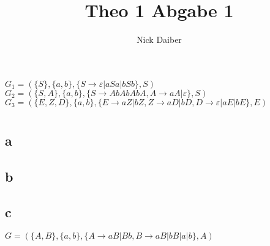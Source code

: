 \documentclass{article}
\title{Theo 1 Abgabe 1}
\author{Nick Daiber}
\begin{document}
    \maketitle
    \section{}
        $G_1 = 
        (\{S\},
        \{a, b\},
        \{S\rightarrow\varepsilon|aSa|bSb\},
        S)$\\
        $G_2 = 
        (\{S, A\},
        \{a,b\},
        \{S\rightarrow AbAbAbA,
        A\rightarrow aA|\varepsilon\},
        S)$\\
        $G_3 = 
        (\{E,Z,D\},
        \{a, b\},
        \{
        E\rightarrow aZ|bZ,
        Z\rightarrow aD|bD,
        D\rightarrow \varepsilon|aE|bE\},
        E)$\\
    \section{}
        \subsection{a}
        \subsection{b}
        \subsection{c}
            $G= 
            (\{A, B\},
            \{a,b\},
            \{
            A\rightarrow aB|Bb,
            B\rightarrow aB|bB|a|b\},
            A)$\\
\end{document}
